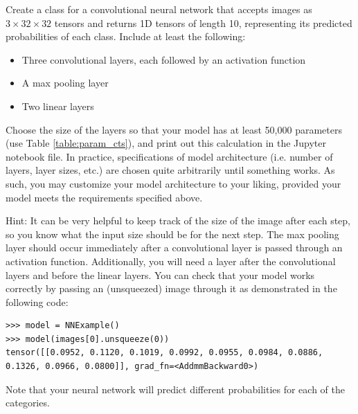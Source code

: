 \begin{problem}
Create a class for a convolutional neural network that accepts images as \(3\times32\times32\) tensors and returns 1D tensors of length 10, representing its predicted probabilities of each class.
Include at least the following:
\begin{itemize}
	\item Three convolutional layers, each followed by an activation function
	\item A max pooling layer
	\item Two linear layers
\end{itemize}
Choose the size of the layers so that your model has at least 50,000 parameters (use Table \ref{table:param_cts}), and print out this calculation in the Jupyter notebook file.
In practice, specifications of model architecture (i.e. number of layers, layer sizes, etc.) are chosen quite arbitrarily until something works.
As such, you may customize your model architecture to your liking, provided your model meets the requirements specified above.

Hint: It can be very helpful to keep track of the size of the image after each step, so you know what the input size should be for the next step.
The max pooling layer should occur immediately after a convolutional layer is passed through an activation function.
Additionally, you will need a  layer after the convolutional layers and before the linear layers.
You can check that your model works correctly by passing an (unsqueezed) image through it as demonstrated in the following code:

\begin{lstlisting}
>>> model = NNExample()
>>> model(images[0].unsqueeze(0))
tensor([[0.0952, 0.1120, 0.1019, 0.0992, 0.0955, 0.0984, 0.0886, 0.1326, 0.0966, 0.0800]], grad_fn=<AddmmBackward0>)
\end{lstlisting}
Note that your neural network will predict different probabilities for each of the categories.

\end{problem}

